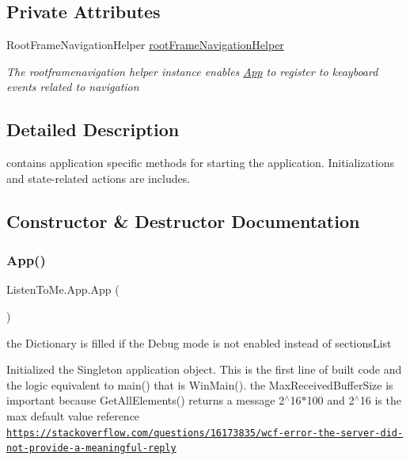 \subsection*{Private Attributes}
\begin{DoxyCompactItemize}
\item 
Root\+Frame\+Navigation\+Helper \mbox{\hyperlink{class_listen_to_me_1_1_app_a92eb573f880ce92d5b9fa79b90ba3f41}{root\+Frame\+Navigation\+Helper}}
\begin{DoxyCompactList}\small\item\em The rootframenavigation helper instance enables \mbox{\hyperlink{class_listen_to_me_1_1_app}{App}} to register to keayboard events related to navigation \end{DoxyCompactList}\end{DoxyCompactItemize}


\subsection{Detailed Description}
contains application specific methods for starting the application. Initializations and state-\/related actions are includes. 



\subsection{Constructor \& Destructor Documentation}
\mbox{\label{class_listen_to_me_1_1_app_a8b865aa5eb8e0a1333c2b29f41bf4aa1}} 
\subsubsection{\texorpdfstring{App()}{App()}}
{\footnotesize\ttfamily Listen\+To\+Me.\+App.\+App (\begin{DoxyParamCaption}{ }\end{DoxyParamCaption})}



the Dictionary is filled if the Debug mode is not enabled instead of sections\+List 

Initialized the Singleton application object. This is the first line of built code and the logic equivalent to main() that is Win\+Main(). the Max\+Received\+Buffer\+Size is important because Get\+All\+Elements() returns a message 2$^\wedge$16$\ast$100 and 2$^\wedge$16 is the max default value reference \href{https://stackoverflow.com/questions/16173835/wcf-error-the-server-did-not-provide-a-meaningful-reply}{\tt https\+://stackoverflow.\+com/questions/16173835/wcf-\/error-\/the-\/server-\/did-\/not-\/provide-\/a-\/meaningful-\/reply}

